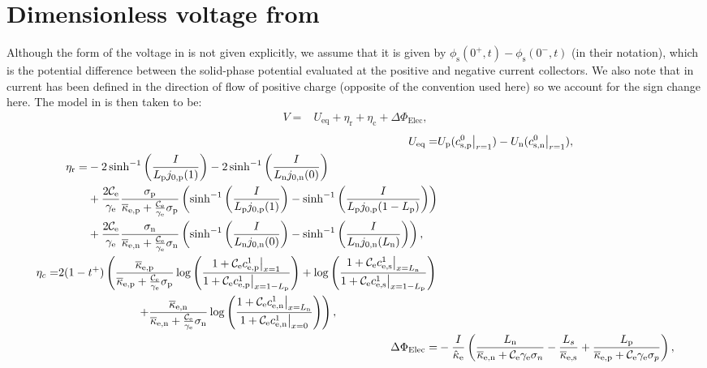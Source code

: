 \documentclass[a4paper]{article}
\newcommand{\ts}[1]{_{\text{#1}}}
\newcommand{\mybar}{\overline}
\begin{document}
\section{Dimensionless voltage from \cite{kemper2013extended}}\label{app:dimVoltage}
Although the form of the voltage in \cite{kemper2013extended} is not given explicitly, we assume that it is given by $\phi\ts{s}(0^+,t)-\phi\ts{s}(0^-,t)$ (in their notation), which is the potential difference between the solid-phase potential evaluated at the positive and negative current collectors. We also note that in \cite{kemper2013extended} current has been defined in the direction of flow of positive charge (opposite of the convention used here) so we account for the sign change here. The model in \cite{kemper2013extended} is then taken to be:
\begin{align}
    V =& U_{\text{eq}} + \eta\ts{r} + \eta\ts{c} + \Delta\Phi\ts{Elec},
\end{align} 
\begin{align}
     U\ts{eq} =& U\ts{p}(c\ts{s,p}^0\big|_{r=1})-U\ts{n}(c\ts{s,n}^0\big|_{r=1}), \\
     \begin{split}
	   \eta\ts{r} = & - 2\sinh^{-1}\left(\frac{I}{L\ts{p} j\ts{0,p}(1)}\right) 
        - 2\sinh^{-1}\left(\frac{I}{L\ts{n} j\ts{0,n}(0)}\right) \\ 
					& + \frac{2 \mathcal{C}\ts{e}}{\gamma\ts{e}} \frac{\sigma\ts{p}}{\mybar{\kappa}\ts{e,p} + \frac{\mathcal{C}\ts{e}}{\gamma\ts{e}}\sigma\ts{p}}\left(\sinh^{-1}\left(\frac{I}{L\ts{p} j\ts{0,p}(1)}\right) - \sinh^{-1}\left(\frac{I}{L\ts{p} j\ts{0,p}(1-L\ts{p})}\right) \right) \\ 
					& + \frac{2 \mathcal{C}\ts{e}}{\gamma\ts{e}} \frac{\sigma\ts{n}}{\mybar{\kappa}\ts{e,n} + \frac{\mathcal{C}\ts{e}}{\gamma\ts{e}}\sigma\ts{n}}\left(\sinh^{-1}\left(\frac{I}{L\ts{n} j\ts{0,n}(0)}\right) - \sinh^{-1}\left(\frac{I}{L\ts{n} j\ts{0,n}(L\ts{n})}\right) \right), 
        \end{split}\\ 
        \begin{split}
        \eta_c =& 2(1-t^+)\left( 
		  \frac{\mybar{\kappa}\ts{e,p}}{\mybar{\kappa}\ts{e,p}+\frac{\mathcal{C}\ts{e}}{\gamma\ts{e}}\sigma\ts{p}}\log\left(\frac{1+\mathcal{C}\ts{e} c\ts{e,p}^1\big|_{x=1}}{1+\mathcal{C}\ts{e} c\ts{e,p}^1\big|_{x=1-L\ts{p}}}\right)
        + \log\left( \frac{1+\mathcal{C}\ts{e} c\ts{e,s}^1\big|_{x=L\ts{n}}}{1+\mathcal{C}\ts{e} c\ts{e,s}^1\big|_{x=1-L\ts{p}}} \right) \right. \\
        & \hphantom{2(1-t^+) (1-t)}
		\left. +\frac{\mybar{\kappa}\ts{e,n}}{\mybar{\kappa}\ts{e,n}+\frac{\mathcal{C}\ts{e}}{\gamma\ts{e}}\sigma\ts{n}}\log\left(\frac{1+\mathcal{C}\ts{e} c\ts{e,n}^1\big|_{x=L\ts{n}}}{1+\mathcal{C}\ts{e} c\ts{e,n}^1\big|_{x=0}}\right)
        \right),
        \end{split} \\
	 \Delta\Phi_{\text{Elec}} =& - \frac{I}{\hat{\kappa}\ts{e}}\left( \frac{L\ts{n}}{\mybar{\kappa}\ts{e,n} + \mathcal{C}\ts{e} \gamma\ts{e}\sigma_n}
        - \frac{L_s}{\mybar{\kappa}\ts{e,s}} + \frac{L\ts{p}}{\mybar{\kappa}\ts{e,p}+\mathcal{C}\ts{e} \gamma\ts{e} \sigma_p}\right),
\end{align}
\end{document}
